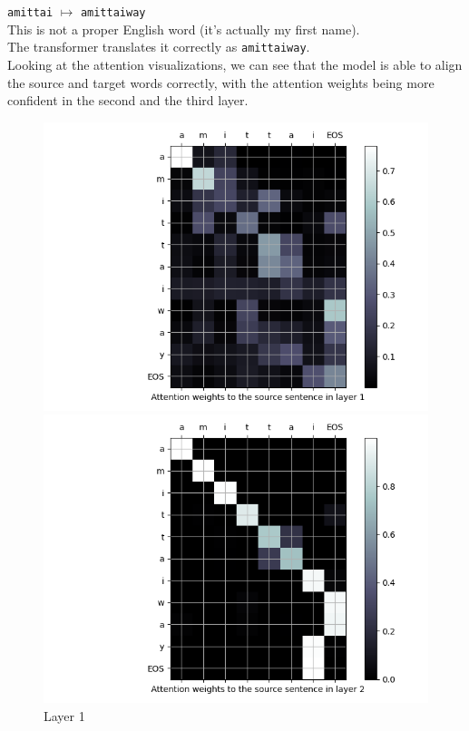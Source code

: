 \begin{enumarabic}
  \item \verb|amittai| $\mapsto$ \verb|amittaiway| \\
    This is not a proper English word (it's actually my first name). \\
    The transformer translates it correctly as \verb|amittaiway|. \\
    Looking at the attention visualizations, we can see that the model
    is able to align the source and target words correctly,
    with the attention weights being more confident in the second and the third layer.
    \begin{figure}[H]
      \centering
      \begin{minipage}[b]{0.33\textwidth}
        \centering
        \includegraphics[width=\textwidth]{figures/amittai-0.png}
        \caption{Layer 1}
        \label{fig:amittai-0}
      \end{minipage}
      \hfill
      \begin{minipage}[b]{0.33\textwidth}
        \centering
        \includegraphics[width=\textwidth]{figures/amittai-1.png}

\end{minipage}
\end{figure}
\end{enumarabic}
